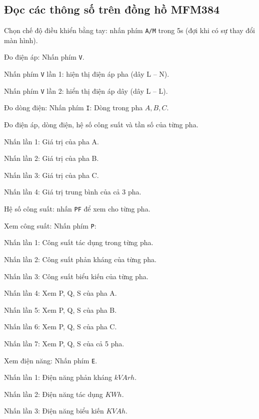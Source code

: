 \documentclass[13pt,a4paper]{extarticle}
\begin{document}
\subsection{Đọc các thông số trên đồng hồ MFM384}
\begin{list}{--}{}
\item Chọn chế độ điều khiển bằng tay: nhấn phím \verb|A/M| trong 5s (đợi khi có sự thay đổi màn hình).
\item Đo điện áp: Nhấn phím \verb|V|.
\begin{list}{+}{}
\item Nhấn phím \verb|V| lần 1: hiện thị điện áp pha (dây L -- N).
\item Nhấn phím \verb|V| lần 2: hiển thị điện áp dây (dây L -- L).
\end{list}
\item Đo dòng điện: Nhấn phím \verb|I|: Dòng trong pha $A,B,C$.
\item Đo điện áp, dòng điện, hệ số công suất và tần số của từng pha.
\begin{list}{+}{}
\item Nhấn lần 1: Giá trị của pha A.
\item Nhấn lần 2: Giá trị của pha B.
\item Nhấn lần 3: Giá trị của pha C.
\item Nhấn lần 4: Giá trị trung bình của cả 3 pha.
\end{list}
\item Hệ số công suất: nhấn \verb|PF| để xem cho từng pha.
\item Xem công suất: Nhấn phím \verb|P|:
\begin{list}{+}{}
\item Nhấn lần 1: Công suất tác dụng trong từng pha.
\item Nhấn lần 2: Công suất phản kháng của từng pha.
\item Nhấn lần 3: Công suất biểu kiến của từng pha.
\item Nhấn lần 4: Xem P, Q, S của pha A.
\item Nhấn lần 5: Xem P, Q, S của pha B.
\item Nhấn lần 6: Xem P, Q, S của pha C.
\item Nhấn lần 7: Xem P, Q, S của cả 5 pha.
\end{list}
\item Xem điện năng: Nhấn phím \verb|E|.
\begin{list}{+}{}
\item Nhấn lần 1: Điện năng phản kháng $kVArh$.
\item Nhấn lần 2: Điện năng tác dụng $KWh$.
\item Nhấn lần 3: Điện năng biểu kiến $KVAh$.
\end{list}
\end{list}
\end{document}
